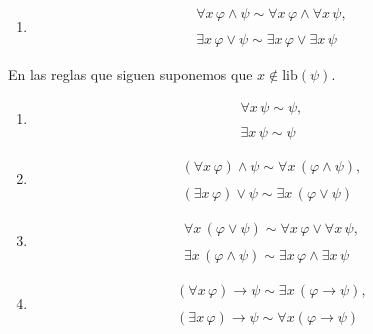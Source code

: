 \begin{theorem}
\begin{enumerate}
    \item 
\[ \begin{matrix} 
\forall x \, \varphi \wedge \psi \sim \forall x \, \varphi \wedge \forall x\, \psi,\\
\\
\exists x \, \varphi \lor \psi \sim \exists x \, \varphi \lor \exists x\, \psi
\end{matrix} \]    
\end{enumerate}
En las reglas que siguen suponemos que $x \notin \mbox{lib}(\psi)$.
\begin{enumerate}[resume]
    \item 
\[ \begin{matrix}
\forall x \, \psi \sim \psi,\\
\\
\exists x \, \psi \sim \psi
\end{matrix} \]    
    
   \item 
\[ \begin{matrix}
(\forall x \, \varphi) \wedge \psi \sim \forall x \, (\varphi \wedge \psi),\\
\\
(\exists x \, \varphi) \lor \psi \sim \exists x \, (\varphi \lor \psi)
\end{matrix} \]   

    \item
\[ \begin{matrix}
\forall x \, (\varphi \lor \psi) \sim \forall x \, \varphi \lor \forall x \, \psi,\\
\\
\exists x \, (\varphi \wedge \psi) \sim \exists x \, \varphi \wedge \exists x \, \psi
\end{matrix} \]    
     
    \item 
\[ \begin{matrix}
(\forall x \, \varphi) \rightarrow \psi \sim \exists x \, (\varphi \rightarrow  \psi),\\
\\
(\exists x \, \varphi) \rightarrow \psi \sim \forall x (\varphi \rightarrow  \psi)
\end{matrix} \]    
\end{enumerate}
\end{theorem}

